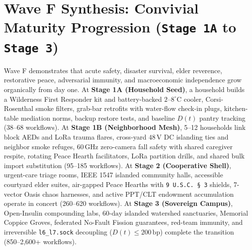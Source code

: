 \section{Wave F Synthesis: Convivial Maturity Progression (\texttt{Stage 1A} to \texttt{Stage 3})}
\label{sec:wave-f-maturity}

Wave F demonstrates that acute safety, disaster survival, elder reverence, restorative peace, adversarial immunity, and macroeconomic independence grow
organically from day one. At \textbf{Stage 1A (Household Seed)}, a household builds a Wilderness First Responder kit and battery-backed
$2\text{--}8^\circ\mathrm{C}$ cooler, Corsi-Rosenthal smoke filters, grab-bar retrofits with water-flow check-in plugs, kitchen-table mediation norms,
backup restore tests, and baseline $D(t)$ pantry tracking (38--68 workflows). At \textbf{Stage 1B (Neighborhood Mesh)}, 5--12 households link block AEDs
and LoRa trauma flares, cross-yard $48\,\mathrm{V}$ DC islanding ties and neighbor smoke refuges, $60\,\mathrm{GHz}$ zero-camera fall safety with shared
caregiver respite, rotating Peace Hearth facilitators, LoRa partition drills, and shared bulk import substitution (95--185 workflows). At \textbf{Stage
2 (Cooperative Shell)}, urgent-care triage rooms, IEEE 1547 islanded community halls, accessible courtyard elder suites, air-gapped Peace Hearths with
\texttt{9 U.S.C.\ \S~3} shields, 7-vector Oasis chaos harnesses, and active PPT/CLT endowment accumulation operate in concert (260--620 workflows). At
\textbf{Stage 3 (Sovereign Campus)}, Open-Insulin compounding labs, $60\text{-day}$ islanded watershed sanctuaries, Memorial Coppice Groves, federated
No-Fault Fission guarantees, red-team immunity, and irreversible \texttt{l6\_l7.sock} decoupling ($D(t) \le 200\,\mathrm{bp}$) complete the transition
(850--2,600+ workflows).

